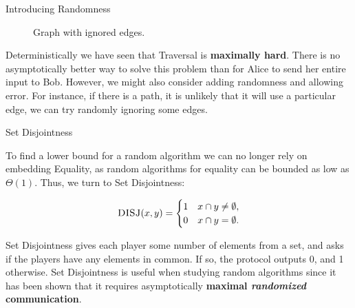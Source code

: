 \begin{block}{Introducing Randomness}
\begin{figure}
		\caption{Graph with ignored edges.}
	\end{figure}


	Deterministically we have seen that Traversal is \textbf{maximally hard}.
	There is no asymptotically better way to solve this problem than for
	Alice to send her entire input to Bob. However, we might also consider
	adding randomness and allowing error. For instance, if there is a
	path, it is unlikely that it will use a particular edge,
	we can try randomly ignoring some edges.

\end{block}

\begin{block}{Set Disjointness}

	To find a lower bound for a random algorithm we can no longer rely on
	embedding Equality, as random algorithms for equality can be bounded
	as low as $\Theta(1)$. Thus, we turn to Set Disjointness:

	\[
		\textsc{DISJ}(x,y)=
		\begin{cases}
			1 & x \cap y \neq \emptyset, \\
			0 & x \cap y = \emptyset.
		\end{cases}
	\]

	Set Disjointness gives each player some number of elements from a set,
	and asks if the players have any elements in common. If so, the
	protocol outputs 0, and 1 otherwise. Set Disjointness is useful when
	studying random algorithms since it has been shown that it requires
	asymptotically \textbf{maximal \emph{randomized} communication}.

\end{block}

